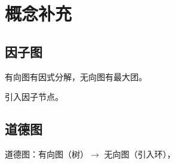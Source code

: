 \chapter{概念补充}

\section{因子图}

有向图有因式分解，无向图有最大团。

引入因子节点。

\section{道德图}

道德图：有向图（树）$\rightarrow$ 无向图（引入环），
